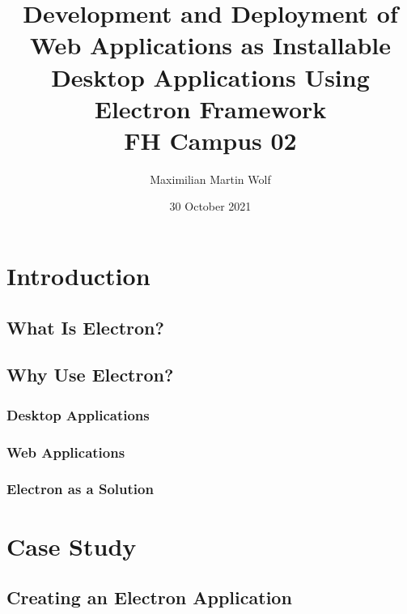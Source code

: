 \documentclass[11pt]{article}
\title{
        {Development and Deployment of Web Applications as Installable Desktop Applications Using
    Electron Framework}\\
    {\large FH Campus 02}\\
}
\author{Maximilian Martin Wolf}
\date{30 October 2021}
\begin{document}
    \maketitle
    \pagebreak
    \tableofcontents
    \pagebreak


    \section{Introduction}\label{sec:introduction}
    \setcounter{tocdepth}{3}

    \subsection{What Is Electron?}\label{subsec:what-is-electron}
    

    \subsection{Why Use Electron?}\label{subsec:why-use-electron}
    

    \subsubsection{Desktop Applications}\label{subsubsec:desktop-applications}
    

    \subsubsection{Web Applications}\label{subsubsec:web-applications}
    

    \subsubsection{Electron as a Solution}\label{subsubsec:electron-as-solution}
    
    \clearpage

    \section{Case Study}\label{sec:method}
    
    
    
    

    \subsection{Creating an Electron Application}\label{subsec:developing-with-electron-creation}
    
\end{document}
